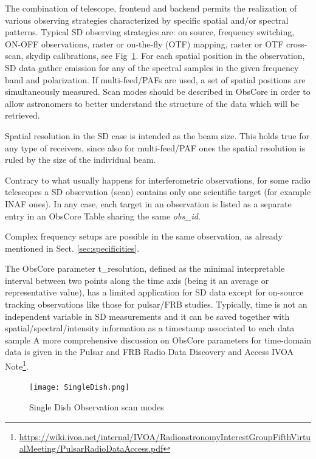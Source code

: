 \documentclass[11pt,a4paper]{ivoa}
\begin{document}
The combination of telescope, frontend and backend permits the realization of various observing strategies characterized by specific spatial and/or spectral patterns.
Typical SD observing strategies are: on source, frequency switching, ON-OFF observations, raster or on-the-fly (OTF) mapping, raster or OTF cross-scan, skydip calibrations, see Fig~\ref{fig:SD}. For each spatial position in the observation, SD data gather emission for any of the spectral samples in the given frequency band and polarization.
If multi-feed/PAFs are used, a set of spatial positions are simultaneously measured. Scan modes should be described in ObsCore in order to allow astronomers to better understand the structure of the data which will be retrieved.

Spatial resolution in the SD case is intended as the beam size. This holds true for any type of receivers, since also for multi-feed/PAF ones the spatial resolution is ruled by the size of the individual beam.

Contrary to what usually happens for  interferometric observations, for some radio telescopes a SD observation (scan) contains only one scientific target (for example INAF ones). In any case, each target in an observation is listed as a separate entry in an ObsCore Table sharing the same \emph{obs\_id}.

Complex frequency setups are possible in the same observation, as already mentioned in Sect. \ref{sec:specificities}.

The ObsCore parameter t\_resolution, defined as the minimal interpretable interval between two points along the
time axis (being it an average or representative value), has a limited application for SD data except for on-source tracking
observations like those for pulsar/FRB studies.
Typically, time is not an independent variable in SD measurements and it can be saved together with spatial/spectral/intensity
information as a timestamp associated to each data sample
A more comprehensive discussion on ObsCore parameters for time-domain data is given in the Pulsar
and FRB Radio Data Discovery and Access IVOA Note\footnote{\url{https://wiki.ivoa.net/internal/IVOA/RadioastronomyInterestGroupFifthVirtualMeeting/PulsarRadioDataAccess.pdf}}.




\begin{figure}[H]
\centering

\texttt{[image: SingleDish.png]}
\caption{Single Dish Observation scan modes}
\label{fig:SD}
\end{figure}
\end{document}
